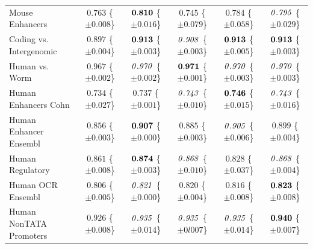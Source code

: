 \documentclass{article} %
\begin{document}
{\begin{table}[t!]
\begin{center}
\begin{scriptsize}
\begin{tabular}{lccccc}
\\
\midrule
Mouse Enhancers         
&  $0.763$ \tiny\{$\pm 0.008$\}  %
&  $\bf0.810$ \tiny\{$\pm 0.016 $\} %
&  $0.745$ \tiny\{$\pm 0.079$\}  %
&  $0.784$ \tiny\{$\pm 0.058$\} %
&  $\it0.795$ \tiny\{$\pm 0.029$\} %
\\
Coding vs. Intergenomic 
&  $0.897$ \tiny\{$\pm 0.004$\} %
&  $\bf0.913$ \tiny\{$\pm 0.003$\} %
&  $\it0.908$ \tiny\{$\pm 0.003$\} %
&  $\bf0.913$ \tiny\{$\pm 0.005$\} %
&  $\bf0.913$ \tiny\{$\pm 0.003$\} %
\\
Human vs. Worm          
&  $0.967$ \tiny\{$\pm 0.002$\} %
&  $\it0.970$ \tiny\{$\pm 0.002$\} %
&  $\bf0.971$ \tiny\{$\pm 0.001$\} %
&  $\it0.970$ \tiny\{$\pm 0.003$\} %
&  $\it0.970$ \tiny\{$\pm 0.003$\} %
\\
Human Enhancers Cohn    
&  $0.734$ \tiny\{$\pm 0.027$\} %
&  $0.737$ \tiny\{$\pm 0.001$\} %
&  $\it0.743$ \tiny\{$\pm 0.010$\} %
&  $\bf0.746$ \tiny\{$\pm 0.015$\} %
&  $\it0.743$ \tiny\{$\pm 0.016$\} %
\\
Human Enhancer Ensembl  
&  $0.856$ \tiny\{$\pm 0.003$\} %
&  $\bf0.907$ \tiny\{$\pm 0.000$\} %
&  $0.885$ \tiny\{$\pm 0.003$\} %
&  $\it0.905$ \tiny\{$\pm 0.006$\} %
&  $0.899$ \tiny\{$\pm 0.004$\} %
\\
Human Regulatory        
&  $0.861$ \tiny\{$\pm 0.008$\} %
&  $\bf0.874$ \tiny\{$\pm 0.003$\} %
&  $\it0.868$ \tiny\{$\pm 0.010$\} %
&  $0.828$ \tiny\{$\pm 0.037$\} %
&  $\it0.868$ \tiny\{$\pm 0.004$\} %
\\
Human OCR Ensembl       
&  $0.806$ \tiny\{$\pm 0.005$\} %
&  $\it0.821$ \tiny\{$\pm 0.000$\} %
&  $0.820$ \tiny\{$\pm 0.004$\} %
&  $0.816$ \tiny\{$\pm 0.008$\} %
&  $\bf0.823$ \tiny\{$\pm 0.008$\} %
\\
Human NonTATA Promoters 
&  $0.926$ \tiny\{$\pm 0.008$\} %
&  $\it0.935$ \tiny\{$\pm 0.014$\} %
&  $\it0.935$ \tiny\{$\pm 0l007$\} %
&  $\it0.935$ \tiny\{$\pm 0.014$\} %
&  $\bf0.940$ \tiny\{$\pm 0.007$\} %
\\

\bottomrule
\end{tabular}
\end{scriptsize}
\end{center}
\vskip -0.1in
\end{table}



}
\end{document}
